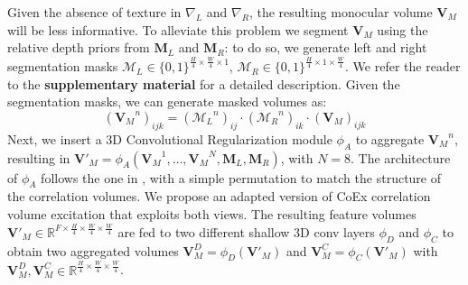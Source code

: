 \documentclass[10pt,twocolumn,letterpaper]{article}
\begin{document}
Given the absence of texture in $\nabla_L$ and $\nabla_R$, the resulting monocular volume $\mathbf{V}_M$ will be less informative.
To alleviate this problem we segment $\mathbf{V}_M$ using the relative depth priors from $\mathbf{M}_L$ and $\mathbf{M}_R$: to do so, we generate left and right segmentation masks $\mathcal{M}_L \in \{0,1\}^{\frac{H}{4} \times \frac{W}{4} \times 1}$, $\mathcal{M}_R \in \{0,1\}^{\frac{H}{4} \times 1 \times \frac{W}{4}}$.
We refer the reader to the \textbf{supplementary material} for a detailed description.
Given the segmentation masks, we can generate masked volumes as:
\begin{equation}
    ({\mathbf{V}_M}^n)_{ijk} = ({\mathcal{M}_L}^n)_{ij} \cdot ({\mathcal{M}_R}^n)_{ik} \cdot (\mathbf{V}_M)_{ijk}
    \label{eq:vol_masking}
\end{equation}
Next, we insert a 3D Convolutional Regularization module $\phi_A$ to aggregate ${\mathbf{V}_M}^n$, resulting in ${\mathbf{V}'}_M=\phi_A({\mathbf{V}_M}^1,\dots,{\mathbf{V}_M}^{N},\mathbf{M}_L,\mathbf{M}_R)$, with $N=8$. The architecture of $\phi_A$ follows the one in \cite{xu2023iterative}, with a simple permutation to match the structure of the correlation volumes.
We propose an adapted version of CoEx \cite{bangunharcana2021correlate} correlation volume excitation that exploits both views.
The resulting feature volumes ${\mathbf{V}'}_M \in \mathbb{R}^{F \times \frac{H}{4} \times \frac{W}{4} \times \frac{W}{4}}$ are fed to two different shallow 3D conv layers $\phi_D$ and $\phi_C$ to obtain two aggregated volumes $\mathbf{V}^D_M = \phi_D({\mathbf{V}'}_M)$ and $\mathbf{V}^C_M = \phi_C({\mathbf{V}'}_M)$ with $\mathbf{V}^D_M,\mathbf{V}^C_M \in \mathbb{R}^{\frac{H}{4} \times \frac{W}{4} \times \frac{W}{4}}$.
\end{document}
